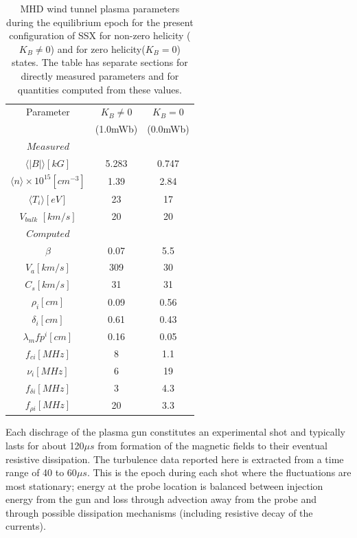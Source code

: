 \documentclass[aip,prl,amsmath,amssymb,reprint,superscriptaddress]{revtex4-1} %
\begin{document}




\begin{table}
\caption{\label{tab:params}MHD wind tunnel plasma parameters during the equilibrium epoch for the present configuration of SSX for non-zero helicity ($K_{B}\neq 0$) and for zero helicity($K_{B}=0$) states. The table has separate sections for directly measured parameters and for quantities computed from these values.}
\begin{tabular}{c|cc}
\toprule
Parameter&$K_{B}\neq 0$&$K_{B}=0$\\
				 &(1.0mWb)             &(0.0mWb)\\
\hline
$Measured$&&\\
\hline
$\langle |B|\rangle [kG]$&5.283&0.747\\
$\langle n\rangle \times 10^{15} [cm^{-3}]$&1.39&2.84\\
$\langle T_{i}\rangle [eV]$&23&17\\
$V_{bulk}$ $[km/s]$&20&20\\
\hline
$Computed$&&\\
\hline
$\beta$&0.07&5.5\\
$V_{a} [km/s]$&309&30\\
$C_{s} [km/s]$&31&31\\
$\rho_{i} [cm]$&0.09&0.56\\
$\delta_{i} [cm]$&0.61&0.43\\
$\lambda_mfp^{i} [cm]$&0.16&0.05\\
$f_{ci} [MHz]$&8&1.1\\
$\nu_{i} [MHz]$&6&19\\
$f_{\delta i} [MHz]$&3&4.3\\
$f_{\rho i} [MHz]$&20&3.3\\
\hline
\end{tabular}
\end{table}

Each dischrage of the plasma gun constitutes an experimental shot and typically lasts for about 120$\mu s$ from formation of the magnetic fields to their eventual resistive dissipation. The turbulence data reported here is extracted from a time range of 40 to 60$\mu s$. This is the epoch during each shot where the fluctuations are most stationary; energy at the probe location is balanced between injection energy from the gun and loss through advection away from the probe and through possible dissipation mechanisms (including resistive decay of the currents).
\end{document}
